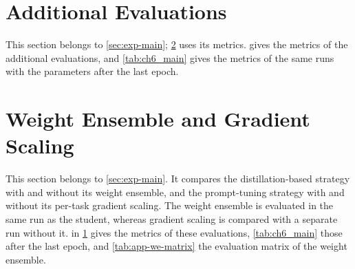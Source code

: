 \FloatBarrier
\section{Additional Evaluations}
\label{sec:app-additional}

This section belongs to \cref{sec:exp-main}; \cref{sec:exp-components} uses its metrics.
 gives the metrics of the additional evaluations, and \cref{tab:ch6_main} gives the metrics of the same runs with the parameters after the last epoch.

\begin{table}[!tb]
\centering
\caption[Additional evaluations]{Additional evaluations (full training split, original task order, one run each). Best validation: checkpoint with the lowest validation loss (\cref{sec:method-adaptation}). Weight ensemble: the weight ensemble of the distillation-based strategy (\cref{subsec:method-distillation}). No scaling: without the per-task gradient scaling (\cref{subsec:method-prompt}). Mean \gls{dsc}; $\uparrow$/$\downarrow$: higher/lower is better.}
\label{tab:ch6_components}

\end{table}

\FloatBarrier
\section{Weight Ensemble and Gradient Scaling}
\label{sec:exp-components}
This section belongs to \cref{sec:exp-main}.
It compares the distillation-based strategy with and without its weight ensemble, and the prompt-tuning strategy with and without its per-task gradient scaling.
The weight ensemble is evaluated in the same run as the student, whereas gradient scaling is compared with a separate run without it.
 in \cref{sec:app-additional} gives the metrics of these evaluations, \cref{tab:ch6_main} those after the last epoch, and \cref{tab:app-we-matrix} the evaluation matrix of the weight ensemble.

